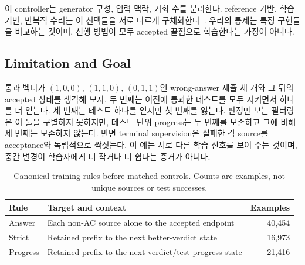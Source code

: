 \documentclass[10pt,conference]{IEEEtran}
\begin{document}
이 controller는 generator 구성, 입력 맥락, 기회 수를 분리한다. reference 기반, 학습 기반, 반복적 수리는 이 선택들을 서로 다르게 구체화한다~\cite{gulwani2018automated,tufano2019empirical,yang2024cref}. 우리의 통제는 특정 구현들을 비교하는 것이며, 선행 방법이 모두 accepted 끝점으로 학습한다는 가정이 아니다.

\subsection{Limitation and Goal}
\label{sec:limitation}
통과 벡터가 \((1,0,0)\), \((1,1,0)\), \((0,1,1)\)인 wrong-answer 제출 세 개와 그 뒤의 accepted 상태를 생각해 보자. 두 번째는 이전에 통과한 테스트를 모두 지키면서 하나를 더 얻는다. 세 번째는 테스트 하나를 얻지만 첫 번째를 잃는다. 판정만 보는 필터링은 이 둘을 구별하지 못하지만, 테스트 단위 progress는 두 번째를 보존하고 그에 비해 세 번째는 보존하지 않는다. 반면 terminal supervision은 실패한 각 source를 acceptance와 독립적으로 짝짓는다. 이 예는 서로 다른 학습 신호를 보여 주는 것이며, 중간 변경이 학습자에게 더 작거나 더 쉽다는 증거가 아니다.

\begin{table}[h]
\caption{Canonical training rules before matched controls. Counts are examples, not unique sources or test successes.}
\label{tab:rules}
\centering\small
\begin{tabular}{l||>{\raggedright\arraybackslash}p{4.1cm}|r}
\toprule
Rule & Target and context & Examples \\
\midrule
Answer & Each non-AC source alone to the accepted endpoint & 40,454 \\
Strict & Retained prefix to the next better-verdict state & 16,973 \\
Progress & Retained prefix to the next verdict/test-progress state & 21,416 \\
\bottomrule
\end{tabular}
\end{table}
\end{document}
